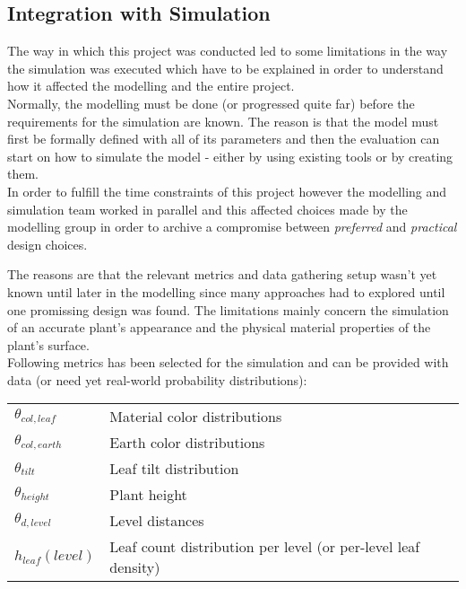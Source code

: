\graphicspath{{members/ssr/figures/}}

\subsection{Integration with Simulation}\label{subsec:integration-with-simulation}

The way in which this project was conducted led to some limitations in the way the simulation was executed
which have to be explained in order to understand how it affected the modelling and the entire project.\\

Normally, the modelling must be done (or progressed quite far) before the requirements for the simulation are known.
The reason is that the model must first be formally defined with all of its parameters and then the evaluation can start
on how to simulate the model - either by using existing tools or by creating them.\\

In order to fulfill the time constraints of this project however the modelling and simulation team worked in parallel and
this affected choices made by the modelling group in order to archive a compromise between \textit{preferred} and \textit{practical} design choices.

The reasons are that the relevant metrics and data gathering setup wasn't yet known until later in the modelling
since many approaches had to explored until one promissing design was found.
The limitations mainly concern the simulation of an accurate plant's appearance and the physical material properties
of the plant's surface.\\

Following metrics has been selected for the simulation and can be provided with data (or need yet real-world probability distributions):\\

\begin{center}
    \begin{tabular}{ |l|l| }
        \hline
        $\theta_{col,leaf}$ & Material color distributions \\
        $\theta_{col,earth}$ & Earth color distributions  \\
        $\theta_{tilt}$ & Leaf tilt distribution  \\
        $\theta_{height}$ & Plant height  \\
        $\theta_{d,level}$ & Level distances  \\
        $h_{leaf}(level)$ & Leaf count distribution per level (or per-level leaf density) \\
        \hline
    \end{tabular}
\end{center}